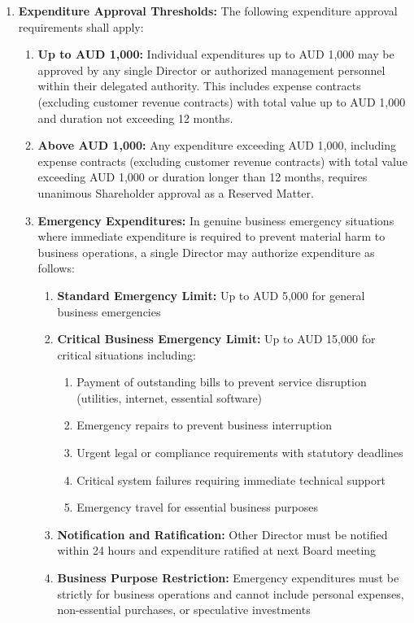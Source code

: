 \begin{enumerate}[label=(\alph*)]
\item \textbf{Expenditure Approval Thresholds:} The following expenditure approval requirements shall apply:
    \begin{enumerate}[label=(\roman*)]
    \item \textbf{Up to AUD 1,000:} Individual expenditures up to AUD 1,000 may be approved by any single Director or authorized management personnel within their delegated authority. This includes expense contracts (excluding customer revenue contracts) with total value up to AUD 1,000 and duration not exceeding 12 months.
    \item \textbf{Above AUD 1,000:} Any expenditure exceeding AUD 1,000, including expense contracts (excluding customer revenue contracts) with total value exceeding AUD 1,000 or duration longer than 12 months, requires unanimous Shareholder approval as a Reserved Matter.
    \item \textbf{Emergency Expenditures:} In genuine business emergency situations where immediate expenditure is required to prevent material harm to business operations, a single Director may authorize expenditure as follows:
    \begin{enumerate}[label=(\alph*)]
    \item \textbf{Standard Emergency Limit:} Up to AUD 5,000 for general business emergencies
    \item \textbf{Critical Business Emergency Limit:} Up to AUD 15,000 for critical situations including:
        \begin{enumerate}[label=(\roman*)]
        \item Payment of outstanding bills to prevent service disruption (utilities, internet, essential software)
        \item Emergency repairs to prevent business interruption
        \item Urgent legal or compliance requirements with statutory deadlines
        \item Critical system failures requiring immediate technical support
        \item Emergency travel for essential business purposes
        \end{enumerate}
    \item \textbf{Notification and Ratification:} Other Director must be notified within 24 hours and expenditure ratified at next Board meeting
    \item \textbf{Business Purpose Restriction:} Emergency expenditures must be strictly for business operations and cannot include personal expenses, non-essential purchases, or speculative investments

\end{enumerate}
\end{enumerate}
\end{enumerate}
